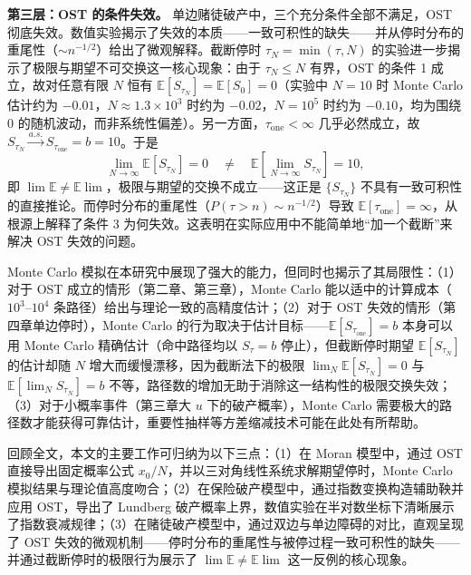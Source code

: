 \textbf{第三层：OST 的条件失效。} 单边赌徒破产中，三个充分条件全部不满足，OST 彻底失效。数值实验揭示了失效的本质——一致可积性的缺失——并从停时分布的重尾性（$\sim n^{-1/2}$）给出了微观解释。截断停时 $\tau_N = \min(\tau, N)$ 的实验进一步揭示了极限与期望不可交换这一核心现象：由于 $\tau_N \leqslant N$ 有界，OST 的条件 1 成立，故对任意有限 $N$ 恒有 $\mathbb{E}[S_{\tau_N}] = \mathbb{E}[S_0] = 0$（实验中 $N=10$ 时 Monte Carlo 估计约为 $-0.01$，$N\approx 1.3\times 10^3$ 时约为 $-0.02$，$N=10^5$ 时约为 $-0.10$，均为围绕 $0$ 的随机波动，而非系统性偏差）。另一方面，$\tau_{\text{one}} < \infty$ 几乎必然成立，故 $S_{\tau_N} \xrightarrow{a.s.} S_{\tau_{\text{one}}} = b = 10$。于是
\begin{equation}
  \lim_{N\to\infty} \mathbb{E}[S_{\tau_N}] = 0 \quad \neq \quad
  \mathbb{E}\!\left[\lim_{N\to\infty} S_{\tau_N}\right] = 10,
\end{equation}
即 $\lim\mathbb{E} \neq \mathbb{E}\lim$，极限与期望的交换不成立——这正是 $\{S_{\tau_N}\}$ 不具有一致可积性的直接推论。而停时分布的重尾性（$P(\tau > n) \sim n^{-1/2}$）导致 $\mathbb{E}[\tau_{\text{one}}] = \infty$，从根源上解释了条件 3 为何失效。这表明在实际应用中不能简单地``加一个截断''来解决 OST 失效的问题。

Monte Carlo 模拟在本研究中展现了强大的能力，但同时也揭示了其局限性：（1）对于 OST 成立的情形（第二章、第三章），Monte Carlo 能以适中的计算成本（$10^3$--$10^4$ 条路径）给出与理论一致的高精度估计；（2）对于 OST 失效的情形（第四章单边停时），Monte Carlo 的行为取决于估计目标——$\mathbb{E}[S_{\tau_{\text{one}}}] = b$ 本身可以用 Monte Carlo 精确估计（命中路径均以 $S_\tau = b$ 停止），但截断停时期望 $\mathbb{E}[S_{\tau_N}]$ 的估计却随 $N$ 增大而缓慢漂移，因为截断法下的极限 $\lim_N \mathbb{E}[S_{\tau_N}] = 0$ 与 $\mathbb{E}[\lim_N S_{\tau_N}] = b$ 不等，路径数的增加无助于消除这一结构性的极限交换失效；（3）对于小概率事件（第三章大 $u$ 下的破产概率），Monte Carlo 需要极大的路径数才能获得可靠估计，重要性抽样等方差缩减技术可能在此处有所帮助。

回顾全文，本文的主要工作可归纳为以下三点：（1）在 Moran 模型中，通过 OST 直接导出固定概率公式 $x_0/N$，并以三对角线性系统求解期望停时，Monte Carlo 模拟结果与理论值高度吻合；（2）在保险破产模型中，通过指数变换构造辅助鞅并应用 OST，导出了 Lundberg 破产概率上界，数值实验在半对数坐标下清晰展示了指数衰减规律；（3）在赌徒破产模型中，通过双边与单边障碍的对比，直观呈现了 OST 失效的微观机制——停时分布的重尾性与被停过程一致可积性的缺失——并通过截断停时的极限行为展示了 $\lim\mathbb{E} \neq \mathbb{E}\lim$ 这一反例的核心现象。

